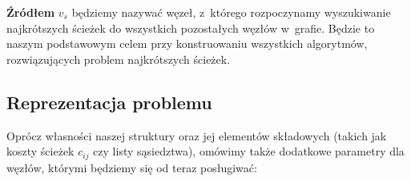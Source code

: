 \begin{myitemize}
\item \textbf{Źródłem} $v_{s}$ będziemy nazywać węzeł, z~którego rozpoczynamy wyszukiwanie najkrótszych ścieżek do wszystkich pozostałych węzłów w~grafie. Będzie to naszym podstawowym celem przy konstruowaniu wszystkich algorytmów, rozwiązujących problem najkrótszych ścieżek.

\end{myitemize}

\subsection{Reprezentacja problemu}
\label{sub:problemRepresentation}

Oprócz własności naszej struktury oraz jej elementów składowych (takich jak koszty ścieżek $c_{ij}$ czy listy sąsiedztwa), omówimy także dodatkowe parametry dla węzłów, którymi będziemy się od teraz posługiwać:

